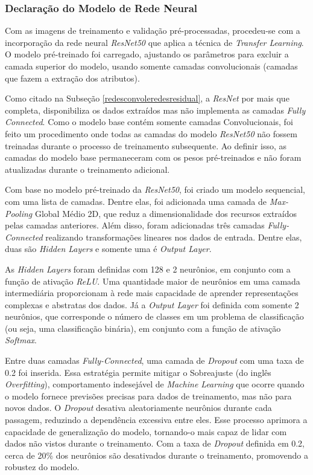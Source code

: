 
\subsubsection{\esp Declaração do Modelo de Rede Neural} \label{camadas}

Com as imagens de treinamento e validação pré-processadas, procedeu-se com a incorporação da rede neural \textit{ResNet50} que aplica a técnica de \textit{Transfer Learning}. O modelo pré-treinado foi carregado, ajustando os parâmetros para excluir a camada superior do modelo, usando somente camadas convolucionais (camadas que fazem a extração dos atributos).

Como citado na Subseção \ref{redesconvoleredesresidual}, a \textit{ResNet} por mais que completa, disponibiliza os dados extraídos mas não implementa as camadas \textit{Fully Connected}. Como o modelo base contém somente camadas Convolucionais, foi feito um procedimento onde todas as camadas do modelo \textit{ResNet50} não fossem treinadas durante o processo de treinamento subsequente. Ao definir isso, as camadas do modelo base permaneceram com os pesos pré-treinados e não foram atualizadas durante o treinamento adicional. 

Com base no modelo pré-treinado da \textit{ResNet50}, foi criado um modelo sequencial, com uma lista de camadas. Dentre elas, foi adicionada uma camada de \textit{Max-Pooling} Global Médio 2D, que reduz a dimensionalidade dos recursos extraídos pelas camadas anteriores. Além disso, foram adicionadas três camadas \textit{Fully-Connected} realizando transformações lineares nos dados de entrada. Dentre elas, duas são \textit{Hidden Layers} e somente uma é \textit{Output Layer}.

As \textit{Hidden Layers} foram definidas com 128 e 2 neurônios, em conjunto com a função de ativação \textit{ReLU}. Uma quantidade maior de neurônios em uma camada intermediária proporcionam à rede mais capacidade de aprender representações complexas e abstratas dos dados. Já a \textit{Output Layer} foi definida com somente 2 neurônios, que corresponde o número de classes em um problema de classificação (ou seja, uma classificação binária), em conjunto com a função de ativação \textit{Softmax}.

Entre duas camadas \textit{Fully-Connected}, uma camada de \textit{Dropout} com uma taxa de 0.2 foi inserida. Essa estratégia permite mitigar o Sobreajuste (do inglês \textit{Overfitting}), comportamento indesejável de \textit{Machine Learning} que ocorre quando o modelo fornece previsões precisas para dados de treinamento, mas não para novos dados. O \textit{Dropout} desativa aleatoriamente neurônios durante cada passagem, reduzindo a dependência excessiva entre eles. Esse processo aprimora a capacidade de generalização do modelo, tornando-o mais capaz de lidar com dados não vistos durante o treinamento. Com a taxa de \textit{Dropout} definida em 0.2, cerca de 20\% dos neurônios são desativados durante o treinamento, promovendo a robustez do modelo.


